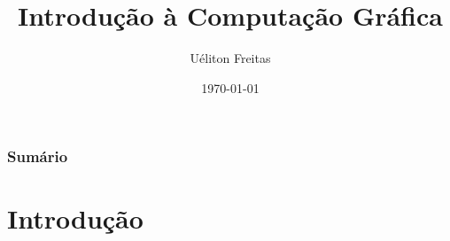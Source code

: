 \documentclass{beamer}
\title[Computação Gráfica]{Introdução à Computação Gráfica} %
\author{Uéliton Freitas} %
\institute[UFMS] %
{
Universidade Católica Don Bosco - UCDB \\ %
\medskip
\textit{freitas.ueliton@gmail.com} %
}
\date{\today} %
\begin{document}
\begin{frame}
\titlepage %
\end{frame}

\begin{frame}
\frametitle{Sumário} %
\tableofcontents %
\end{frame}





\section{Introdução} 


\end{document}
